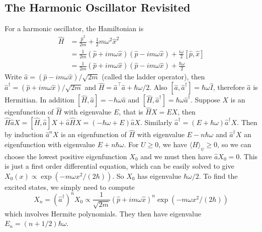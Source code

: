 \subsection{The Harmonic Oscillator Revisited}
For a harmonic oscillator, the Hamiltonian is
\begin{align*}
    \hat{H}&=\frac{\hat{p}^2}{2m}+\frac{1}{2}m\omega^2\hat{x}^2\\
    &=\frac{1}{2m}(\hat{p}+im\omega\hat{x})(\hat{p}-im\omega\hat{x})+\frac{i\omega}{2}[\hat{p},\hat{x}]\\
    &=\frac{1}{2m}(\hat{p}+im\omega\hat{x})(\hat{p}-im\omega\hat{x})+\frac{\hbar\omega}{2}
\end{align*}
Write $\hat{a}=(\hat{p}-im\omega\hat{x})/\sqrt{2m}$ (called the ladder operator), then $\hat{a}^\dagger=(\hat{p}+im\omega\hat{x})/\sqrt{2m}$ and $\hat{H}=\hat{a}^\top\hat{a}+\hbar\omega/2$.
Also $[\hat{a},\hat{a}^\dagger]=\hbar\omega\hat{I}$, therefore $\hat{a}$ is Hermitian.
In addition $[\hat{H},\hat{a}]=-\hbar\omega\hat{a}$ and $[\hat{H},\hat{a}^\dagger]=\hbar\omega\hat{a}^\dagger$.
Suppose $X$ is an eigenfunction of $\hat{H}$ with eigenvalue $E$, that is $\hat{H}X=EX$, then $\hat{H}\hat{a}X=[\hat{H},\hat{a}]X+\hat{a}\hat{H}X=(-\hbar\omega+E)\hat{a}X$.
Similarly $\hat{a}^\dagger =(E+\hbar\omega)\hat{a}^\dagger X$.
Then by induction $\hat{a}^nX$ is an eigenfunction of $\hat{H}$ with eigenvalue $E-n\hbar\omega$ and $\hat{a}^\dagger X$ an eigenfunction with eigenvalue $E+n\hbar\omega$.
For $U\ge 0$, we have $\langle H\rangle_\psi\ge 0$, so we can choose the lowest positive eigenfunction $X_0$ and we must then have $\hat{a}X_0=0$.
This is just a first order differential equation, which can be easily solved to give $X_0(x)\propto\exp(-m\omega x^2/(2\hbar))$.
So $X_0$ has eigenvalue $\hbar\omega/2$.
To find the excited states, we simply need to compute
$$X_n=(\hat{a}^\dagger)^nX_0\propto\frac{1}{\sqrt{2m}}(\hat{p}+im\omega\hat{x})^n\exp(-m\omega x^2/(2\hbar))$$
which involves Hermite polynomials.
They then have eigenvalue $E_n=(n+1/2)\hbar\omega$.